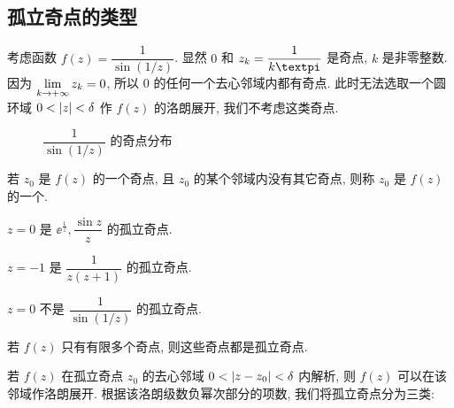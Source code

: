 \subsection{孤立奇点的类型}

\begin{example}
  考虑函数 $f(z)=\dfrac1{\sin(1/z)}$.
  显然 $0$ 和 $z_k=\dfrac1{k\cpi}$ 是奇点, $k$ 是非零整数.
  因为 $\lim\limits_{k\rightarrow+\infty} z_k=0$, 所以 $0$ 的任何一个去心邻域内都有奇点.
  此时无法选取一个圆环域 $0<\lvert z\rvert<\delta$ 作 $f(z)$ 的洛朗展开, 我们不考虑这类奇点.
\end{example}

\begin{figure}[H]
  \centering
  \caption{$\dfrac1{\sin(1/z)}$ 的奇点分布}
\end{figure}

\begin{definition}
  若 $z_0$ 是 $f(z)$ 的一个奇点, 且 $z_0$ 的某个邻域内没有其它奇点, 则称 $z_0$ 是 $f(z)$ 的一个.
\end{definition}

\begin{exampleenum}
  \item $z=0$ 是 $\ee^{\frac1z},\dfrac{\sin z}z$ 的孤立奇点.
  \item $z=-1$ 是 $\dfrac1{z(z+1)}$ 的孤立奇点.
  \smallskip
  \item $z=0$ 不是 $\dfrac1{\sin(1/z)}$ 的孤立奇点.
\end{exampleenum}
\smallskip

若 $f(z)$ 只有有限多个奇点, 则这些奇点都是孤立奇点.

若 $f(z)$ 在孤立奇点 $z_0$ 的去心邻域 $0<\lvert z-z_0\rvert<\delta$ 内解析, 则 $f(z)$ 可以在该邻域作洛朗展开.
根据该洛朗级数负幂次部分的项数, 我们将孤立奇点分为三类:

